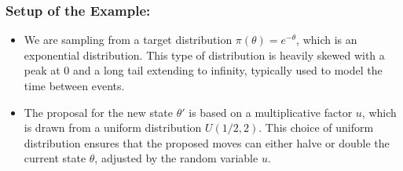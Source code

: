 \documentclass[10pt]{article}
\begin{document}
\subsubsection*{Setup of the Example:}
\begin{itemize}
  \item We are sampling from a target distribution \( \pi(\theta) = e^{-\theta} \), which is an exponential distribution. This type of distribution is heavily skewed with a peak at 0 and a long tail extending to infinity, typically used to model the time between events.
  \item The proposal for the new state \( \theta' \) is based on a multiplicative factor \( u \), which is drawn from a uniform distribution \( U(1/2, 2) \). This choice of uniform distribution ensures that the proposed moves can either halve or double the current state \( \theta \), adjusted by the random variable \( u \).
\end{itemize}
\end{document}
